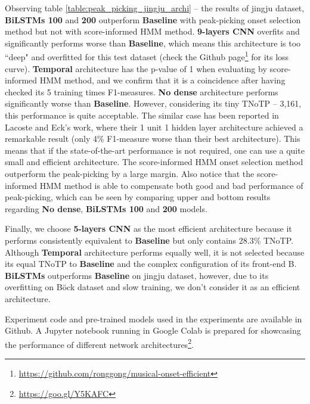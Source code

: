 Observing table \ref{table:peak_picking_jingju_archi} -- the results of jingju dataset, \textbf{\gls{BiLSTM}s 100} and \textbf{200} outperform \textbf{Baseline} with peak-picking onset selection method but not with score-informed \gls{HMM} method. \textbf{9-layers \gls{CNN}} overfits and significantly performs worse than \textbf{Baseline}, which means this architecture is too ``deep" and overfitted for this test dataset (check the Github page\footnote{\url{https://github.com/ronggong/musical-onset-efficient}\label{fn:github}} for its loss curve). \textbf{Temporal} architecture has the p-value of 1 when evaluating by score-informed \gls{HMM} method, and we confirm that it is a coincidence after having checked its 5 training times F1-measures. \textbf{No dense} architecture performs significantly worse than \textbf{Baseline}. However, considering its tiny TNoTP -- 3,161, this performance is quite acceptable. The similar case has been reported in Lacoste and Eck's work\cite{Lacoste2007a}, where their 1 unit 1 hidden layer architecture achieved a remarkable result (only 4\% F1-measure worse than their best architecture). This means that if the state-of-the-art performance is not required, one can use a quite small and efficient architecture. The score-informed \gls{HMM} onset selection method outperform the peak-picking by a large margin. Also notice that the score-informed \gls{HMM} method is able to compensate both good and bad performance of peak-picking, which can be seen by comparing upper and bottom results regarding \textbf{No dense}, \textbf{\gls{BiLSTM}s 100} and \textbf{200} models.

Finally, we choose \textbf{5-layers \gls{CNN}} as the most efficient architecture because it performs consistently equivalent to \textbf{Baseline} but only contains 28.3\% TNoTP. Although \textbf{Temporal} architecture performs equally well, it is not selected because its equal TNoTP to \textbf{Baseline} and the complex configuration of its front-end B. \textbf{\gls{BiLSTM}s} outperforms \textbf{Baseline} on jingju dataset, however, due to its overfitting on B\"{o}ck dataset and slow training, we don't consider it as an efficient architecture.

Experiment code
and pre-trained models used in the experiments are available in Github. A Jupyter notebook running in Google Colab is prepared for showcasing the performance of different network architectures\footnote{\url{https://goo.gl/Y5KAFC}}. 

